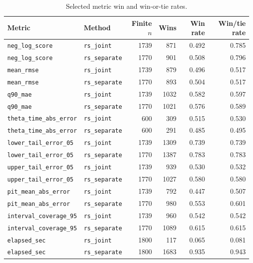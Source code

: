 \documentclass[11pt]{article}
\begin{document}
\begin{table}[ht]
\centering
\caption{Selected metric win and win-or-tie rates.}
\begin{tabular}{llrrrr}
\toprule
Metric & Method & Finite \(n\) & Wins & Win rate & Win/tie rate \\
\midrule
\texttt{neg\_log\_score} & \texttt{rs\_joint} & 1739 & 871 & 0.492 & 0.785 \\
\texttt{neg\_log\_score} & \texttt{rs\_separate} & 1770 & 901 & 0.508 & 0.796 \\
\texttt{mean\_rmse} & \texttt{rs\_joint} & 1739 & 879 & 0.496 & 0.517 \\
\texttt{mean\_rmse} & \texttt{rs\_separate} & 1770 & 893 & 0.504 & 0.517 \\
\texttt{q90\_mae} & \texttt{rs\_joint} & 1739 & 1032 & 0.582 & 0.597 \\
\texttt{q90\_mae} & \texttt{rs\_separate} & 1770 & 1021 & 0.576 & 0.589 \\
\texttt{theta\_time\_abs\_error} & \texttt{rs\_joint} & 600 & 309 & 0.515 & 0.530 \\
\texttt{theta\_time\_abs\_error} & \texttt{rs\_separate} & 600 & 291 & 0.485 & 0.495 \\
\texttt{lower\_tail\_error\_05} & \texttt{rs\_joint} & 1739 & 1309 & 0.739 & 0.739 \\
\texttt{lower\_tail\_error\_05} & \texttt{rs\_separate} & 1770 & 1387 & 0.783 & 0.783 \\
\texttt{upper\_tail\_error\_05} & \texttt{rs\_joint} & 1739 & 939 & 0.530 & 0.532 \\
\texttt{upper\_tail\_error\_05} & \texttt{rs\_separate} & 1770 & 1027 & 0.580 & 0.580 \\
\texttt{pit\_mean\_abs\_error} & \texttt{rs\_joint} & 1739 & 792 & 0.447 & 0.507 \\
\texttt{pit\_mean\_abs\_error} & \texttt{rs\_separate} & 1770 & 980 & 0.553 & 0.601 \\
\texttt{interval\_coverage\_95} & \texttt{rs\_joint} & 1739 & 960 & 0.542 & 0.542 \\
\texttt{interval\_coverage\_95} & \texttt{rs\_separate} & 1770 & 1089 & 0.615 & 0.615 \\
\texttt{elapsed\_sec} & \texttt{rs\_joint} & 1800 & 117 & 0.065 & 0.081 \\
\texttt{elapsed\_sec} & \texttt{rs\_separate} & 1800 & 1683 & 0.935 & 0.943 \\
\bottomrule
\end{tabular}
\end{table}
\end{document}

